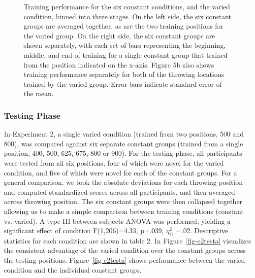 \documentclass[
  12pt,
  letterpaper,
]{article}
\begin{document}
\begin{figure}


\caption{\label{fig-e2train-2}Training performance for the six constant
conditions, and the varied condition, binned into three stages. On the
left side, the six constant groups are averaged together, as are the two
training positions for the varied group. On the right side, the six
constant groups are shown separately, with each set of bars representing
the beginning, middle, and end of training for a single constant group
that trained from the position indicated on the x-axis. Figure 5b also
shows training performance separately for both of the throwing locations
trained by the varied group. Error bars indicate standard error of the
mean.}

\end{figure}%

\subsubsection{Testing Phase}\label{testing-phase-1}

In Experiment 2, a single varied condition (trained from two positions,
500 and 800), was compared against six separate constant groups (trained
from a single position, 400, 500, 625, 675, 800 or 900). For the testing
phase, all participants were tested from all six positions, four of
which were novel for the varied condition, and five of which were novel
for each of the constant groups. For a general comparison, we took the
absolute deviations for each throwing position and computed standardized
scores across all participants, and then averaged across throwing
position. The six constant groups were then collapsed together allowing
us to make a simple comparison between training conditions (constant vs.
varied). A type III between-subjects ANOVA was performed, yielding a
significant effect of condition F(1,206)=4.33, p=.039, \(\eta^{2}_G\)
=.02. Descriptive statistics for each condition are shown in table 2. In
Figure~\ref{fig-e2testa} visualizes the consistent advantage of the
varied condition over the constant groups across the testing positions.
Figure~\ref{fig-e2testa} shows performance between the varied condition
and the individual constant groups.
\end{document}
